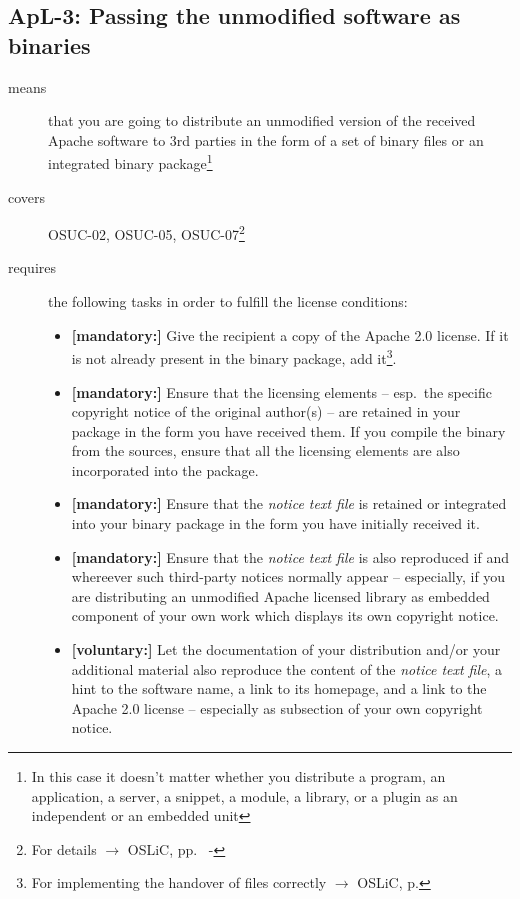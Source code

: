 \subsection{ApL-3: Passing the unmodified software as binaries} 

\begin{description}
\item[means] that you are going to distribute an unmodified version of the
received Apache software to 3rd parties in the form of a set of binary files or an
integrated bi\-na\-ry package\footnote{In this case it doesn't matter
whether you  distribute a program, an application, a server, a snippet, a
module, a library, or a plugin as an independent or an embedded unit}

\item[covers] OSUC-02, OSUC-05, OSUC-07\footnote{For details $\rightarrow$ OSLiC, pp.\
\pageref{OSUC-02-DEF} - \pageref{OSUC-07-DEF}}

\item[requires] the following tasks in order to fulfill the license conditions:
\begin{itemize}
  \item \textbf{[mandatory:]} Give the recipient a copy of the Apache 2.0
  license. If it is not already present in the binary package, add
  it\footnote{For implementing the handover of files correctly $\rightarrow$
  OSLiC, p. \pageref{DistributingFilesHint}}.
  
  \item \textbf{[mandatory:]} Ensure that the licensing elements -- esp.\ the
  specific copyright notice of the original author(s) -- are retained in your
  package in the form you have received them. If you compile the binary from the
  sources, ensure that all the licensing elements are also incorporated into the
  package.
  \item \textbf{[mandatory:]} Ensure that the \emph{notice text file} is
  retained or integrated into your binary package in the form you have initially
  received
  it.
  \item \textbf{[mandatory:]} Ensure that the \emph{notice text file} is also
  reproduced if and whereever such third-party notices normally appear --
  especially, if you are distributing an unmodified Apache licensed library as
  embedded component of your own work which displays its own copyright notice.
  
  \item \textbf{[voluntary:]} Let the documentation of your distribution and/or
  your additional material also reproduce the content of the \emph{notice text
  file}, a hint to the software name, a link to its homepage, and a link to the
  Apache 2.0 license -- especially as subsection of your own copyright notice.
\end{itemize}


\end{description}
